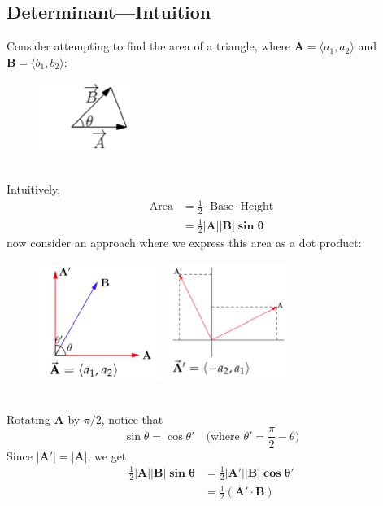 \documentclass{report}
\begin{document}
\subsection{Determinant---Intuition} %
Consider attempting to find the area of a triangle, where $\mathbf{A}=\langle a_1,a_2\rangle$ and $\mathbf{B}=\langle b_1,b_2\rangle$:
\begin{figure}[h]
\includegraphics[width=3cm]{Capture70}\\
\centering
\end{figure}\\
Intuitively,
\begin{align*}
\text{Area}&=\frac{1}{2}\cdot\text{Base}\cdot\text{Height}\\
&=\frac{1}{2}\mathbf{|A||B|\sin\theta}
\end{align*}
now consider an approach where we express this area as a dot product:
\begin{figure}[h]
\includegraphics[width=4cm]{Capture71}
\includegraphics[width=4cm]{Capture72}\\
\centering
\end{figure}\\
Rotating $\mathbf{A}$ by $\pi/2$, notice that
\begin{equation*}
\sin\theta=\cos\theta'\quad\text{(where $\theta'=\frac{\pi}{2}-\theta$)}
\end{equation*}
Since $\mathbf{|A'|=|A|}$, we get
\begin{align*}
\frac{1}{2}\mathbf{|A||B|\sin\theta}&=\frac{1}{2}\mathbf{|A'||B|\cos\theta'}\\
&=\frac{1}{2}(\mathbf{A'\cdot B})
\end{align*}
\end{document}
